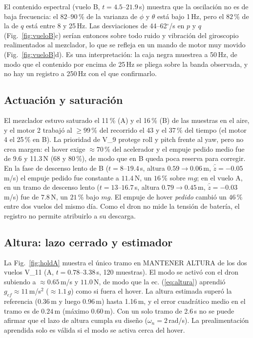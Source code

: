 El contenido espectral (vuelo B, $t=4.5$--$21.9$\,s) muestra que la oscilación no es de baja frecuencia: el $82$--$90$\,\% de la varianza de $\phi$ y $\theta$ está bajo 1\,Hz, pero el $82$\,\% de la de $q$ está entre 8 y 25\,Hz. Las desviaciones de 44--62$^\circ$/s en $p$ y $q$ (Fig.~\ref{fig:vueloB}c) serían entonces sobre todo ruido y vibración del giroscopio realimentados al mezclador, lo que se refleja en un mando de motor muy movido (Fig.~\ref{fig:vueloB}d). Es una interpretación: la caja negra muestrea a 50\,Hz, de modo que el contenido por encima de 25\,Hz se pliega sobre la banda observada, y no hay un registro a 250\,Hz con el que confirmarlo.

\subsection{Actuación y saturación}
El mezclador estuvo saturado el 11\,\% (A) y el 16\,\% (B) de las muestras en el aire, y el motor 2 trabajó al $\ge99$\,\% del recorrido el 43 y el 37\,\% del tiempo (el motor 4 el 25\,\% en B). La prioridad de V\_9 protege roll y pitch frente al yaw, pero no crea margen: el hover exige $\approx70$\,\% del acelerador y el empuje pedido medio fue de 9.6 y 11.3\,N ($68$ y $80$\,\%), de modo que en B queda poca reserva para corregir. En la fase de descenso lento de B ($t=8$--$19.4$\,s, altura $0.59\to0.06$\,m, $\bar{\dot z}=-0.05$\,m/s) el empuje pedido fue constante a $11.4$\,N, un $16$\,\% sobre $mg$; en el vuelo A, en un tramo de descenso lento ($t=13$--$16.7$\,s, altura $0.79\to0.45$\,m, $\bar{\dot z}=-0.03$\,m/s) fue de $7.8$\,N, un $21$\,\% bajo $mg$. El empuje de hover \emph{pedido} cambió un $46$\,\% entre dos vuelos del mismo día. Como el dron no mide la tensión de batería, el registro no permite atribuirlo a su descarga.

\subsection{Altura: lazo cerrado y estimador}
La Fig.~\ref{fig:holdA} muestra el único tramo en MANTENER ALTURA de los dos vuelos V\_11 (A, $t=0.78$--$3.38$\,s, 120 muestras). El modo se activó con el dron subiendo a $\approx0.65$\,m/s y $11.0$\,N, de modo que la ec. (\ref{eq:altura}) aprendió $g_{ef}\approx11$\,m/s$^2$ ($\approx1.1\,g$) como si fuera el hover. La altura estimada superó la referencia (0.36\,m y luego 0.96\,m) hasta 1.16\,m, y el error cuadrático medio en el tramo es de $0.24$\,m (máximo $0.60$\,m). Con un solo tramo de 2.6\,s no se puede afirmar que el lazo de altura cumpla su diseño ($\omega_n=2$\,rad/s). La prealimentación aprendida solo es válida si el modo se activa cerca del hover.

